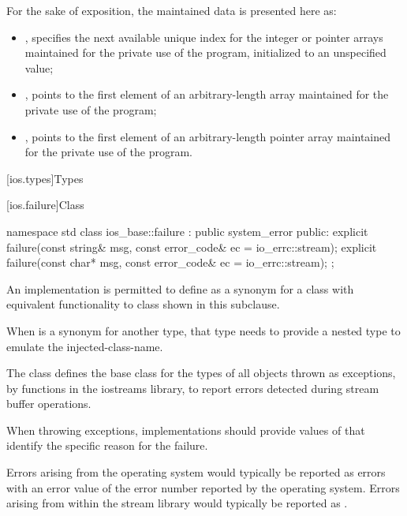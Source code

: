 \pnum
\begin{note}
For the sake of exposition, the maintained data is presented here as:
\begin{itemize}
\item
{},
specifies the next available
unique index for the integer or pointer arrays maintained for the private use
of the program, initialized to an unspecified value;
\item
{},
points to the first element of an
arbitrary-length
array maintained for the private use of the
program;
\item
{},
points to the first element of an
arbitrary-length pointer array maintained for the private use of the program.
\end{itemize}
\end{note}

[ios.types]{Types}

[ios.failure]{Class }

%
%
\begin{codeblock}
namespace std {
  class ios_base::failure : public system_error {
  public:
    explicit failure(const string& msg, const error_code& ec = io_errc::stream);
    explicit failure(const char* msg, const error_code& ec = io_errc::stream);
  };
}
\end{codeblock}

\pnum
An implementation is permitted to define 
as a synonym for a class with equivalent functionality
to class  shown in this subclause.
\begin{note}
When  is a synonym for another type,
that type needs to provide a nested type 
to emulate the injected-class-name.
\end{note}
The class
defines the base class
for the types of all objects thrown as exceptions,
by functions in the iostreams library,
to report errors detected during stream buffer operations.

\pnum
When throwing  exceptions, implementations should provide
values of  that identify the specific reason for the failure.
\begin{note}
Errors arising from the operating system would typically be reported as
 errors with an error value of the error number
reported by the operating system. Errors arising from within the stream library would
typically be reported as .
\end{note}

